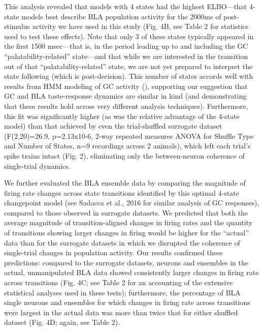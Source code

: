 \begin{refsection}
This analysis revealed that models with 4 states had the highest ELBO—that 4-state models best describe BLA population activity for the 2000ms of post-stimulus activity we have used in this study (Fig. 4B, see Table 2 for statistics used to test these effects). Note that only 3 of these states typically appeared in the first 1500 msec—that is, in the period leading up to and including the GC “palatability-related” state—and that while we are interested in the transition out of that “palatability-related” state, we are not yet prepared to interpret the state following (which is post-decision). This number of states accords well with results from HMM modeling of GC activity (\cite{jones2007a,sadacca2016a}), supporting our suggestion that GC and BLA taste-response dynamics are similar in kind (and demonstrating that these results hold across very different analysis techniques). Furthermore, this fit was significantly higher (as was the relative advantage of the 4-state model) than that achieved by even the trial-shuffled surrogate dataset (F(2,20)=26.9, p=2.13x10-6, 2-way repeated measures ANOVA for Shuffle Type and Number of States, n=9 recordings across 2 animals), which left each trial’s spike trains intact (Fig. 2), eliminating only the between-neuron coherence of single-trial dynamics. 

We further evaluated the BLA ensemble data by comparing the magnitude of firing rate changes across state transitions identified by this optimal 4-state changepoint model (see Sadacca et al., 2016 for similar analysis of GC responses), compared to those observed in surrogate datasets. We predicted that both the average magnitude of transition-aligned changes in firing rates and the quantity of transitions showing larger changes in firing would be higher for the “actual” data than for the surrogate datasets in which we disrupted the coherence of single-trial changes in population activity. Our results confirmed these predictions: compared to the surrogate datasets, neurons and ensembles in the actual, unmanipulated BLA data showed consistently larger changes in firing rate across transitions (Fig. 4C; see Table 2 for an accounting of the extensive statistical analyses used in these tests); furthermore, the percentage of BLA single neurons and ensembles for which changes in firing rate across transitions were largest in the actual data was more than twice that for either shuffled dataset (Fig. 4D; again, see Table 2). 


\end{refsection}
